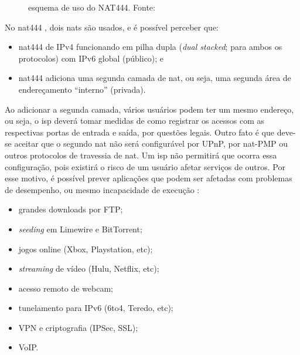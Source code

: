 \begin{figure}[H]
    \centering
    \caption{esquema de uso do NAT444. Fonte:\cite{site:nat444}}
    \label{fig:nat444}
\end{figure}

\newpage
No \gls*{nat}444 \cite{site:nat444}, dois \glspl*{nat} são usados, e é possível
perceber que:

\begin{itemize}
    \item \gls*{nat}444 de IPv4 funcionando em pilha dupla (\emph{dual stacked}; para
        ambos os protocolos) com IPv6 global (público); e

    \item \gls*{nat}444 adiciona uma segunda camada de \gls*{nat}, ou seja, uma segunda
        área de endereçamento ``interno'' (privada).
\end{itemize}

Ao adicionar a segunda camada, vários usuários podem ter um mesmo endereço, ou seja, o
\gls*{isp} deverá tomar medidas de como registrar os acessos com as respectivas portas
de entrada e saída, por questões legais. Outro fato é que deve-se aceitar que o segundo
\gls*{nat} não será configurável por UPnP, por \gls*{nat}-PMP ou outros protocolos de
travessia de \gls*{nat}. Um \gls*{isp} não permitirá que ocorra essa configuração, pois
existirá o risco de um usuário afetar serviços de outros. Por esse motivo, é possível
prever aplicações que podem ser afetadas com problemas de desempenho, ou mesmo
incapacidade de execução \cite{site:rfcnat444}:

\begin{itemize}
    \item grandes downloads por FTP;
    \item \emph{seeding} em Limewire e BitTorrent;
    \item jogos online (Xbox, Playstation, etc);
    \item \emph{streaming} de vídeo (Hulu, Netflix, etc);
    \item acesso remoto de webcam;
    \item tunelamento para IPv6 (6to4, Teredo, etc);
    \item VPN e criptografia (IPSec, SSL);
    \item VoIP.
\end{itemize}